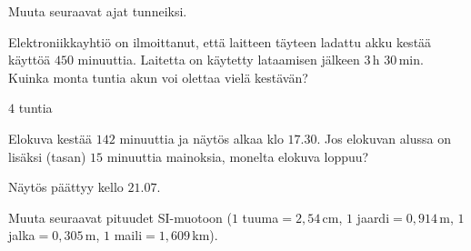 \begin{tehtavasivu}
\begin{tehtava}
Muuta seuraavat ajat tunneiksi.
	\begin{vastaus}
	\end{vastaus}
\end{tehtava}
\begin{tehtava}
Elektroniikkayhtiö on ilmoittanut, että laitteen täyteen ladattu akku kestää käyttöä $450$ minuuttia. Laitetta on käytetty lataamisen jälkeen $3$\,h $30$\,min. Kuinka monta tuntia akun voi olettaa vielä kestävän?
\begin{vastaus}
$4$ tuntia
\end{vastaus}
\end{tehtava}

\begin{tehtava}
Elokuva kestää $142$ minuuttia ja näytös alkaa klo $17.30$. Jos elokuvan alussa on lisäksi (tasan) $15$ minuuttia mainoksia, monelta elokuva loppuu?
	\begin{vastaus}
	Näytös päättyy kello $21.07$.
	\end{vastaus}
\end{tehtava}



\begin{tehtava}
Muuta seuraavat pituudet SI-muotoon ($1$ tuuma$= 2,54$\,cm, $1$ jaardi$=0,914$\,m, $1$ jalka$= 0,305$\,m, $1$ maili$ = 1,609$\,km).
\begin{vastaus}
\end{vastaus}
\end{tehtava}


\end{tehtavasivu}
